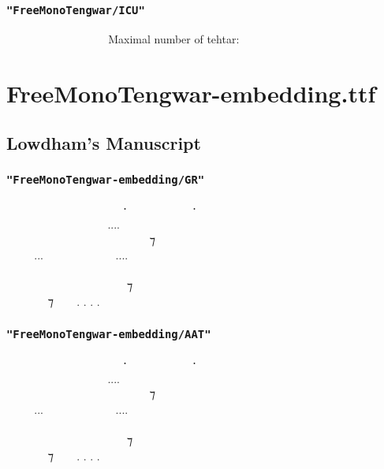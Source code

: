\documentclass[11pt,a4paper]{article}
\begin{document}
\subsubsection*{\texttt{"FreeMonoTengwar/ICU"}}

\freeICU      \normalfont Maximal number of tehtar:
\freeICU  


\newpage

\section{FreeMonoTengwar-embedding.ttf}

\subsection{Lowdham’s Manuscript}

\subsubsection*{\texttt{"FreeMonoTengwar-embedding/GR"}}

\embedGR
  ‍   ⸱‍  ‍ ⸱ \\
    ‍....  ‍  \\
  ‍   ‍ ‍ ⁊ ‍  \\
...  ....   \\
         ‍ \\
 ‍ ‍‍   ⁊  ‍ ‍ \\
 ‍ ⁊  . . . . \normalfont

\subsubsection*{\texttt{"FreeMonoTengwar-embedding/AAT"}}

\embedAAT
  ‍   ⸱‍  ‍ ⸱ \\
    ‍....  ‍  \\
  ‍   ‍ ‍ ⁊ ‍  \\
...  ....   \\
         ‍ \\
 ‍ ‍‍   ⁊  ‍ ‍ \\
 ‍ ⁊  . . . . \normalfont
\end{document}
